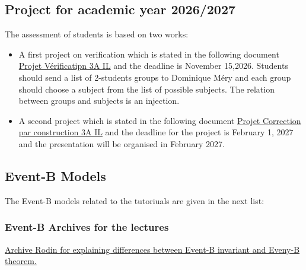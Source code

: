 \documentclass[ 12pt]{article}
\begin{document}
  
  \subsection{Project  for academic year 2026/2027}
\label{sec:project}

The assessment  of students is based on two works:
\begin{itemize}
\item A first project  on verification  which is stated  in the following
  document  \href{http://mery54.github.io/teaching/mosos/lecturesnotes/project-verification2026.pdf}{Projet
    Vérificatipn    3A IL}  and the deadline is November 15,2026.
  Students should send a list of 2-students groups  to Dominique Méry
  and each group should choose a subject  from the list  of possible
  subjects.  The relation between groups and subjects is an injection.
\item A second project which is stated in the following document \href{http://mery54.github.io/teaching/mosos/lecturesnotes/telecom-projects2627.pdf}{Projet
    Correction par construction 
    3A IL}   and the deadline for the project is  February 1, 2027 and
  the presentation will be  organised in   February 2027. 
\end{itemize}



  \subsection{Event-B Models}
\label{sec:event-b-models}


The Event-B models related to the tutoriuals are given in the next list: 

\subsubsection{Event-B Archives for the  lectures}



 
 \href{http://mery54.github.io/teaching/mosos/models/mcfsi0-safety.zip}{Archive Rodin  for  explaining differences between 
   Event-B invariant and Eveny-B theorem. }


 
\end{document}
